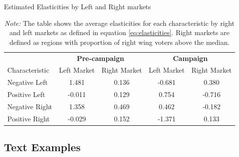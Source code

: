 \documentclass[12pt]{article}
\begin{document}
	
	\begin{table}[!htb]
		
		\caption{Estimated Elasticities by Left and Right markets}
		\begin{tabular}{l|cc|cc}
			\toprule
			& \multicolumn{2}{c|}{\textbf{Pre-campaign}} & \multicolumn{2}{c}{\textbf{Campaign}} \\
			Characteristic & Left Market & Right Market & Left Market & Right Market \\
			\midrule
			Negative Left & 1.481 & 0.136 & -0.681 & 0.380 \\
			Positive Left & -0.011 & 0.129 & 0.754 & -0.716 \\
			Negative Right & 1.358 & 0.469 & 0.462 & -0.182 \\
			Positive Right & -0.029 & 0.152 & -1.371 & 0.133 \\
			\bottomrule
		\end{tabular}
		\caption*{\textit{Note:} \small The table shows the average elasticities for each characteristic by right and left markets as defined in equation \ref{eq:elasticities}. Right markets are defined as regions with proportion of right wing voters above the median. }
		\label{tab:elasticities}
	\end{table}
	
	
	
\clearpage
	\subsection{Text Examples}
	
\end{document}
